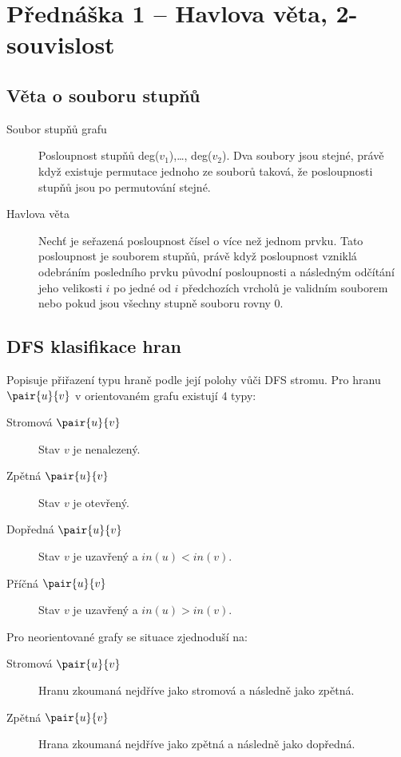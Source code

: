 \section{Přednáška 1 -- Havlova věta, 2-souvislost}

\subsection{Věta o souboru stupňů}\label{alg:havlova-veta}\label{lemma:havlova-veta}

\begin{description}
    \item[Soubor stupňů grafu] Posloupnost stupňů deg($v_1$),\ldots, deg($v_2$).
    Dva soubory jsou stejné, právě když existuje permutace jednoho ze souborů taková, že posloupnosti stupňů jsou po permutování stejné.
    \item[Havlova věta] Nechť  je seřazená posloupnost čísel o více než jednom prvku.
    Tato posloupnost je souborem stupňů, právě když posloupnost vzniklá odebráním posledního prvku původní posloupnosti a následným odčítání jeho velikosti $i$ po jedné od $i$ předchozích vrcholů je validním souborem nebo pokud jsou všechny stupně souboru rovny $0$.
\end{description}

\subsection{DFS klasifikace hran}
 
 Popisuje přiřazení typu hraně podle její polohy vůči DFS stromu. Pro hranu $\pair{u}{v}$ v orientovaném grafu existují 4 typy:

 \begin{description}
     \item[Stromová $\pair{u}{v}$] Stav $v$ je nenalezený.
     \item[Zpětná $\pair{u}{v}$] Stav $v$ je otevřený.
     \item[Dopředná $\pair{u}{v}$] Stav $v$ je uzavřený a $in(u) < in(v)$.
     \item[Příčná $\pair{u}{v}$] Stav $v$ je uzavřený a $in(u) > in(v)$.
 \end{description}

 Pro neorientované grafy se situace zjednoduší na:

  \begin{description}
     \item[Stromová $\pair{u}{v}$] Hranu zkoumaná nejdříve jako stromová a následně jako zpětná.
     \item[Zpětná $\pair{u}{v}$] Hrana zkoumaná nejdříve jako zpětná a následně jako dopředná.
 \end{description}

